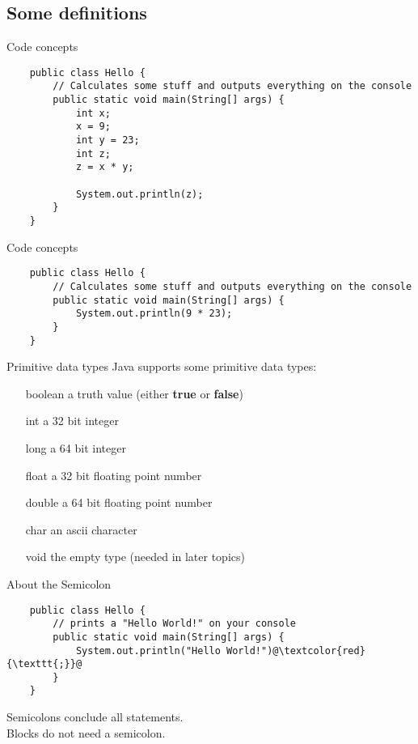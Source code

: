 \subsection{Some definitions}

\begin{frame}[fragile]{Code concepts}
    \begin{lstlisting}
    public class Hello {
        // Calculates some stuff and outputs everything on the console
        public static void main(String[] args) {            
            int x;
            x = 9;
            int y = 23;
            int z;
            z = x * y;
            
            System.out.println(z);
        }
    }
    \end{lstlisting}
\end{frame}

\begin{frame}[fragile]{Code concepts}
    \begin{lstlisting}
    public class Hello {
        // Calculates some stuff and outputs everything on the console
        public static void main(String[] args) {
            System.out.println(9 * 23);
        }
    }
    \end{lstlisting}
\end{frame}

\begin{frame}{Primitive data types}
    Java supports some primitive data types:
    \begin{itemize}
        \item[boolean] a truth value (either \textbf{true} or \textbf{false})
        \item[int] a 32 bit integer
        \item[long] a 64 bit integer
        \item[float] a 32 bit floating point number
        \item[double] a 64 bit floating point number
        \item[char] an ascii character
        \item[void] the empty type (needed in later topics)
    \end{itemize}
\end{frame}

\begin{frame}[fragile]{About the Semicolon}
    \begin{lstlisting}
    public class Hello {
        // prints a "Hello World!" on your console
        public static void main(String[] args) {
            System.out.println("Hello World!")@\textcolor{red}{\texttt{;}}@
        }
    }
    \end{lstlisting}
    Semicolons conclude all statements. \\
    Blocks do not need a semicolon.
\end{frame}

